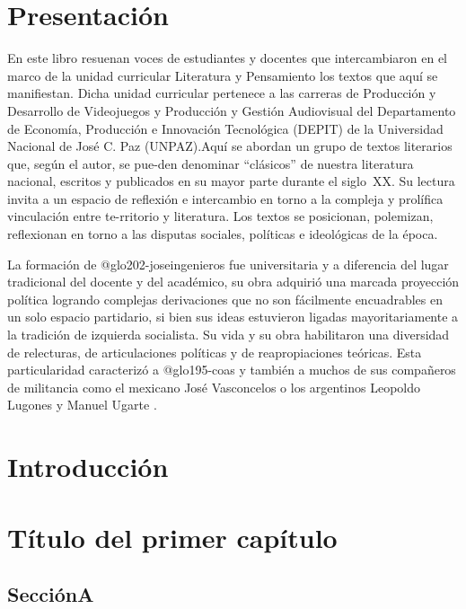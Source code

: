\chapter{Presentación}

En este libro resuenan voces de estudiantes y docentes que intercambiaron en el marco de la unidad curricular Literatura y Pensamiento los textos que aquí se manifiestan. Dicha unidad curricular pertenece a las carreras de Producción y Desarrollo de Videojuegos y Producción y Gestión Audiovisual del Departamento de Economía, Producción e Innovación Tecnológica (DEPIT) de la Universidad Nacional de José C. Paz (UNPAZ).Aquí se abordan un grupo de textos literarios que, según el autor, se pue-den denominar \enquote{clásicos} de nuestra literatura nacional, escritos y publicados en su mayor parte durante el siglo~XX. Su lectura invita a un espacio de reflexión e intercambio en torno a la compleja y prolífica vinculación entre te-rritorio y literatura. Los textos se posicionan, polemizan, reflexionan en torno a las disputas sociales, políticas e ideológicas de la época.

La formación de \gls{@glo202-joseingenieros} fue universitaria y a diferencia del lugar tradicional del docente y del académico, su obra adquirió una marcada proyección política logrando complejas derivaciones que no son fácilmente encuadrables en un solo espacio partidario, si bien sus ideas estuvieron ligadas mayoritariamente a la tradición de izquierda socialista. Su vida y su obra habilitaron una diversidad de relecturas, de articulaciones políticas y de reapropiaciones teóricas. Esta particularidad caracterizó a \gls{@glo195-coas} y también a muchos de sus compañeros de militancia como el mexicano José Vasconcelos o los argentinos Leopoldo Lugones y Manuel Ugarte \parencite{@3070-TARKOVSKI1995}.

\chapter{Introducción}

\mainmatter

\chapter{Título del primer capítulo}

\section{SecciónA}

